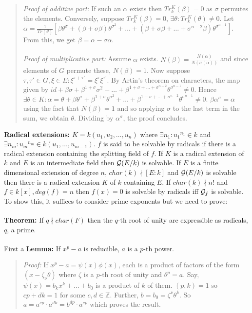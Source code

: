 \begin{quote}
\emph{Proof of additive part:}
If such an $\alpha$ exists then $Tr_k^K(\beta)=0$ as $\sigma$ permutes
the elements. Conversely,
suppose $Tr_k^K(\beta)=0$, $\exists \theta: Tr_k^K(\theta) \ne 0$.
Let $\alpha = {\frac 1 {Tr(\theta)}} [ 
\beta \theta^{\sigma} +
(\beta + \sigma \beta) \theta^{\sigma^2} + \ldots +
(\beta + \sigma \beta + \ldots + \sigma^{n-2} \beta) \theta^{\sigma^{n-1}}]$.
From this, we get $\beta= \alpha - \sigma \alpha$.
\\
\\
\emph{Proof of multiplicative part:}
Assume $\alpha$ exists.  $N(\beta)= {\frac {N(\alpha)} {N(\sigma(\alpha))}}$ 
and since elements of $G$ permute these, $N(\beta)=1$.  Now suppose
$\tau, \tau' \in G, \xi \in E: \xi^{\tau + \tau'}= 
\xi^{\tau} \xi^{\tau'} $.   By Artin's theorem on characters, the map given by
$ id+ \beta \sigma + \beta^{1+\sigma} \sigma^2+ \ldots +
\beta^{1+\sigma + \ldots + \sigma^{n-2}} \theta^{\sigma^{n-1}} \ne 0 $.
Hence $\exists \theta \in K: 
\alpha= \theta + \beta \theta^{\sigma} + \beta^{1+\sigma} \theta^{\sigma^2} + \ldots +
\beta^{1 + \sigma + \ldots + \sigma^{n-2}} \theta^{\sigma^{n-1}} \ne 0$.  
$\beta \alpha^{\sigma}= \alpha$ using the fact that $N(\beta)=1$ and so
applying $\sigma$ to the last term in the sum, we obtain $\theta$.  Dividing by
$\alpha^{\sigma}$, the proof concludes.
\end{quote}
{\bf Radical extensions:} $K= k(u_1, u_2, \ldots , u_n)$ where
$\exists n_1 : {u_1}^{n_1} \in k$ and
$\exists n_m : {u_m}^{n_m} \in k(u_1 , \ldots , u_{m-1})$.  $f$ is said to
be solvable by radicals if there is a radical extension containing the splitting
field of $f$.
If $K$ is a radical extension of $k$  and $E$ is an intermediate field
then ${\cal G}(E/k)$ is solvable.
If $E$ is a finite dimensional extension of degree $n$, $char(k) \nmid [E:k]$
and ${\cal G}(E/k)$ is solvable then there is a radical extension
$K$ of $k$ containing $E$.  If $char(k) \nmid n!$ and $f \in k[x], deg(f)=n$ then
$f(x)=0$ is solvable by radicals iff ${\cal G}_f$ is solvable.  To show this,
it suffices to consider prime exponents but we need
to prove:
\\
\\
{\bf Theorem:} If $q \nmid char(F)$ then the $q$-th root of unity are expressible as radicals, $q$,
a prime.
\\
\\
First a {\bf Lemma:} If $x^p-a$ is reducible, $a$ is a $p$-th power.
\begin{quote}
\emph{Proof:}
If $x^p-a = \psi(x) \phi(x)$, each is a product of factors of the form $(x- \zeta_{\nu} \theta)$ where
$\zeta$ is a $p$-th root of unity and $\theta^p=a$.  Say, $\psi(x)= b_k x^k + \ldots + b_0$ is 
a product of $k$ of them.  $(p,k)=1$ so $cp+dk=1$ for some $c, d \in {\mathbb Z}$.  Further,
$b= b_0= \zeta^{\nu} \theta^k$.  So $a=a^{cp} \cdot a^{dk}= b^{dp} \cdot a^{cp}$ which proves
the result.
\end{quote}
